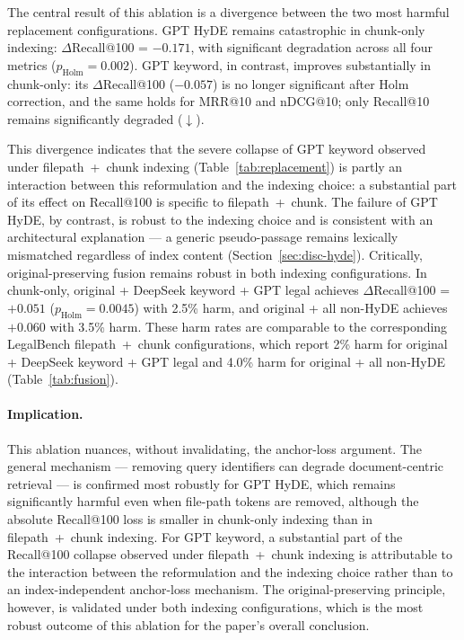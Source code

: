 \documentclass[a4paper,fleqn]{cas-dc}
\begin{document}
The central result of this ablation is a divergence
between the two most harmful replacement
configurations. GPT HyDE remains catastrophic in
chunk-only indexing: $\Delta$Recall@100 = $-0.171$,
with significant degradation across all four metrics
($p_{\text{Holm}} = 0.002$). GPT keyword, in contrast,
improves substantially in chunk-only: its
$\Delta$Recall@100 ($-0.057$) is no longer significant
after Holm correction, and the same holds for MRR@10
and nDCG@10; only Recall@10 remains significantly
degraded ($\downarrow$).

This divergence indicates that the severe collapse of
GPT keyword observed under filepath~+~chunk indexing
(Table~\ref{tab:replacement}) is partly an interaction
between this reformulation and the indexing choice: a
substantial part of its effect on Recall@100 is
specific to filepath~+~chunk. The failure of GPT HyDE,
by contrast, is robust to the indexing choice and is
consistent with an architectural explanation --- a
generic pseudo-passage remains lexically mismatched
regardless of index content (Section~\ref{sec:disc-hyde}).
Critically, original-preserving fusion remains robust
in both indexing configurations. In chunk-only,
original + DeepSeek keyword + GPT legal achieves
$\Delta$Recall@100 = $+0.051$ ($p_{\text{Holm}} =
0.0045$) with 2.5\% harm, and original + all non-HyDE
achieves $+0.060$ with 3.5\% harm. These harm rates
are comparable to the corresponding LegalBench
filepath~+~chunk configurations, which report 2\%
harm for original + DeepSeek keyword + GPT legal and
4.0\% harm for original + all non-HyDE
(Table~\ref{tab:fusion}).


\paragraph{Implication.}
This ablation nuances, without invalidating, the
anchor-loss argument. The general mechanism --- removing
query identifiers can degrade document-centric retrieval
--- is confirmed most robustly for GPT HyDE, which remains
significantly harmful even when file-path tokens are
removed, although the absolute Recall@100 loss is smaller
in chunk-only indexing than in filepath~+~chunk indexing.
For GPT keyword, a substantial part of the Recall@100
collapse observed under filepath~+~chunk indexing is
attributable to the interaction between the reformulation
and the indexing choice rather than to an index-independent
anchor-loss mechanism. The original-preserving principle,
however, is validated under both indexing configurations,
which is the most robust outcome of this ablation for the
paper's overall conclusion.
\end{document}
